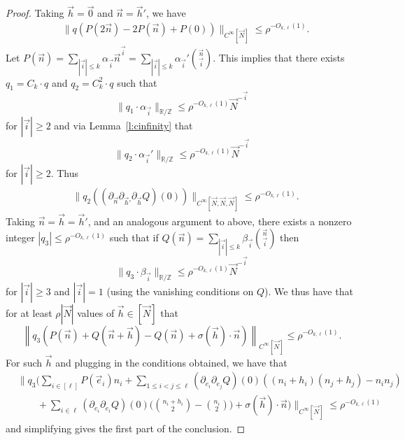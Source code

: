 \documentclass[11pt, a4paper]{amsart}
\theoremstyle{plain}
\theoremstyle{plain}
\theoremstyle{definition}
\theoremstyle{remark}
\numberwithin{equation}{section}
\numberwithin{lemma}{section}
\numberwithin{proposition}{section}
\numberwithin{corollary}{section}
\numberwithin{definition}{section}
\numberwithin{claim}{section}
\begin{document}
\begin{proof}
Taking $\vec{h} = \vec{0}$ and $\vec{n} = \vec{h}'$, we have
\begin{align*}
&\|q(P(2\vec{n}) - 2P(\vec{n}) + P(0))\|_{C^{\infty}[\vec{N}]}\le \rho^{-O_{k,\ell}(1)}.
\end{align*}
Let $P(\vec{n}) = \sum_{|\vec{i}|\le k}\alpha_{\vec{i}}\vec{n}^{\vec{i}}= \sum_{|\vec{i}|\le k}\alpha_{\vec{i}}'\binom{\vec{n}}{\vec{i}}$. This implies that there exists $q_1 = C_k \cdot q$ and $q_2 = C_k^{2} \cdot q$ such that 
\[\|q_1\cdot \alpha_{\vec{i}}\|_{\mathbb{R}/\mathbb{Z}} \le \rho^{-O_{k,\ell}(1)}\vec{N}^{-\vec{i}}\]
for $|\vec{i}|\ge 2$ and via Lemma~\ref{l:cinfinity} that
\[\|q_2\cdot \alpha_{\vec{i}}'\|_{\mathbb{R}/\mathbb{Z}} \le \rho^{-O_{k,\ell}(1)}\vec{N}^{-\vec{i}}\]
for $|\vec{i}|\ge 2$. Thus 
 \begin{align*}
&\|q_2((\partial_{\vec{n}}\partial_{\vec{h}'}\partial_{\vec{h}}Q)(0))\|_{C^{\infty}[\vec{N},\vec{N},\vec{N}]}\le \rho^{-O_{k,\ell}(1)}.
\end{align*}
Taking $\vec{n} = \vec{h} = \vec{h}'$, and an analogous argument to above, there exists a nonzero integer $|q_3| \le \rho^{-O_{k,\ell}(1)}$ such that if $Q(\vec{n}) = \sum_{|\vec{i}|\le k}\beta_{\vec{i}}\binom{\vec{n}}{\vec{i}}$ then 
\[\|q_3\cdot \beta_{\vec{i}}\|_{\mathbb{R}/\mathbb{Z}} \le \rho^{-O_{k,\ell}(1)}\vec{N}^{-\vec{i}}\]
for $|\vec{i}|\ge 3$ and $|\vec{i}| = 1$ (using the vanishing conditions on $Q$). We thus have that for at least $\rho|\vec{N}|$ values of $\vec{h}\in [\vec{N}]$ that 
\[\left\|q_3\left(P(\vec{n}) + Q(\vec{n} + \vec{h}) - Q(\vec{n}) + \sigma(\vec{h}) \cdot \vec{n}\right)\right\|_{C^\infty[\vec{N}]}\le \rho^{-O_{k,\ell}(1)}.\]
For such $\vec{h}$ and plugging in the conditions obtained, we have that 
\begin{align*}
&\bigg\|q_3\bigg(\sum_{i\in[\ell]}P(\vec{e}_i)n_i + \sum_{1\le i<j\le \ell}(\partial_{e_i}\partial_{e_j}Q)(0)((n_i+h_i)(n_j+h_j)-n_in_j)\\
&\qquad+ \sum_{i\in \ell}(\partial_{e_i}\partial_{e_i}Q)(0)\bigg(\binom{n_i+h_i}{2}-\binom{n_i}{2}\bigg) +  \sigma(\vec{h}) \cdot \vec{n}\bigg)\bigg\|_{C^\infty[\vec{N}]}\le \rho^{-O_{k,\ell}(1)}
\end{align*}
and simplifying gives the first part of the conclusion.


\end{proof}
\end{document}

